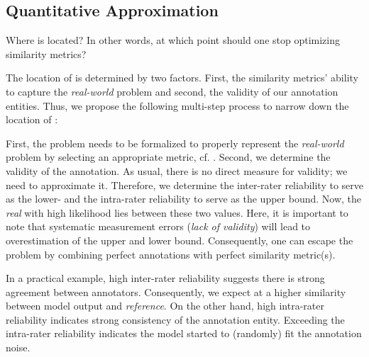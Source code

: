 \subsection{Quantitative Approximation}
Where is  located?
In other words, at which point should one stop optimizing similarity metrics?

The location of  is determined by two factors.
First, the similarity metrics' ability to capture the \emph{real-world} problem and second, the validity of our annotation entities.
Thus, we propose the following multi-step process to narrow down the location of :

First, the  problem needs to be formalized to properly represent the \emph{real-world} problem by selecting an appropriate metric, cf. .
Second, we determine the validity of the annotation.
As usual, there is no direct measure for validity; we need to approximate it.
Therefore, we determine the inter-rater reliability to serve as the lower- and the intra-rater reliability to serve as the upper bound.
Now, the \emph{real}  with high likelihood lies between these two values.
Here, it is important to note that systematic measurement errors (\emph{lack of validity}) will lead to overestimation of the upper and lower bound.
Consequently, one can escape the  problem by combining perfect annotations with perfect similarity metric(s).

In a practical example, high inter-rater reliability suggests there is strong agreement between annotators.
Consequently, we expect  at a higher similarity between model output and \emph{reference}.
On the other hand, high intra-rater reliability indicates strong consistency of the annotation entity.
Exceeding the intra-rater reliability indicates the model started to (randomly) fit the annotation noise.
